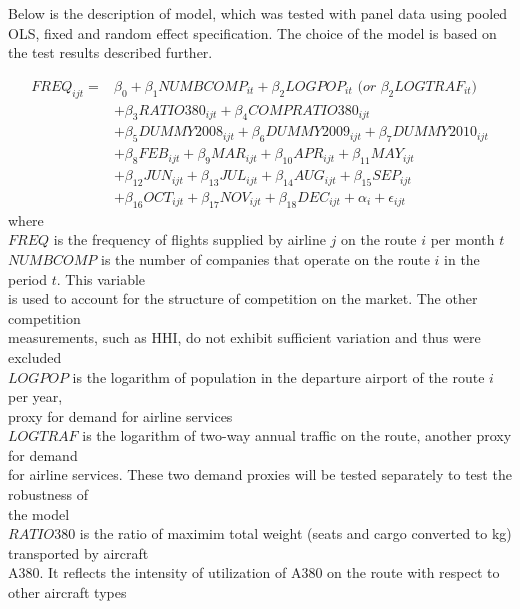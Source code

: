 \documentclass[titlepage, 11pt]{article}
\begin{document}
Below is the description of model, which was tested with panel data using pooled OLS, fixed and random effect specification. The choice of the model is based on the test results described further. 

\begin{equation} \label{eq:5}
\begin{split}
FREQ_{ijt} =& \beta_0 + \beta_1NUMBCOMP_{it} + \beta_2LOGPOP_{it}  \textit{ (or } \beta_2LOGTRAF_{it}\textit{) }\\ &+\beta_3RATIO380_{ijt}+\beta_4COMPRATIO380_{ijt}\\ &+\beta_5DUMMY2008_{ijt}+\beta_6DUMMY2009_{ijt} + \beta_7DUMMY2010_{ijt} \\ 
&+\beta_8FEB_{ijt}+\beta_9MAR_{ijt}+\beta_{10}APR_{ijt}+\beta_{11}MAY_{ijt}\\ &+\beta_{12}JUN_{ijt}+\beta_{13}JUL_{ijt}+\beta_{14}AUG_{ijt}+\beta_{15}SEP_{ijt}\\
&+\beta_{16}OCT_{ijt}+\beta_{17}NOV_{ijt}+\beta_{18}DEC_{ijt}+\alpha_i+\epsilon_{ijt} 
\end{split}
\end{equation}
where \\ 
$FREQ$ is the frequency of flights supplied by airline $j$ on the route $i$ per month $t$\\ 
$NUMBCOMP$ is the number of companies that operate on the route $i$ in the period $t$. This variable\\  \tab is used to account   for the structure of competition on the market. The other competition \\  \tab measurements, such as HHI, do not exhibit sufficient variation and thus were excluded  \\
$LOGPOP$ is the logarithm of population in the departure airport of the route $i$ per year, \\ \tab proxy for demand for airline services\\
$LOGTRAF$ is the logarithm of two-way annual traffic on the route, another proxy for demand \\  \tab for airline services. These two demand proxies will be tested separately to test the robustness of \\ 
\tab  the model\\
$RATIO380$ is the ratio of maximim total weight (seats and cargo converted to kg) transported by aircraft \\ 
\tab A380. It reflects the intensity of utilization of A380 on the route with respect to other aircraft types\\ 
\end{document}
